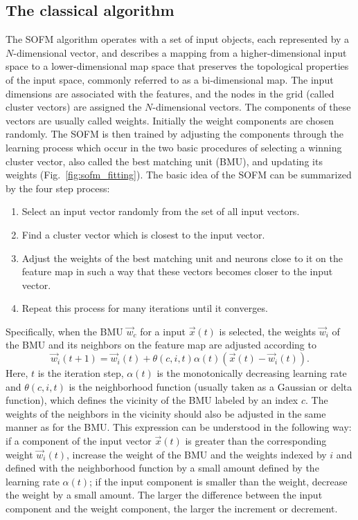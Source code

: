\documentclass[pra,showkeys,twocolumn,showpacs,aps,10pt]{revtex4-2}
\begin{document}
\subsection{The classical algorithm}

The SOFM algorithm operates with a set of input objects, each represented by a $N$-dimensional vector,
and describes a mapping from a higher-dimensional input space to a lower-dimensional map space that preserves the topological properties of the input space, commonly referred to as a bi-dimensional map.  The input dimensions are associated with the features,
and the nodes in the grid (called cluster vectors) are assigned the $N$-dimensional vectors.
The components of these vectors are usually called weights.
Initially the weight components are chosen randomly.
The SOFM is then trained by adjusting the components through the learning process which occur in the two basic procedures of
selecting a winning cluster vector, also called the best matching unit (BMU), and updating its weights (Fig.~\ref{fig:sofm_fitting}).  The basic idea of the SOFM can be summarized by the four step process:
%
\begin{enumerate}
\item Select an input vector randomly from the set of all input vectors.
\item Find a cluster vector which is closest to the input vector.
\item Adjust the weights of the best matching unit and neurons close to it on the feature map in such a way   that these vectors  becomes closer to the input vector.
\item Repeat this process for many iterations until it converges.
\end{enumerate}

Specifically, when the BMU $\vec{w}_{c}$ for a input $\vec{x}(t)$ is selected,
the weights $\vec{w}_{i}$ of the BMU and its neighbors on the feature map are adjusted according to
%
\begin{equation}
    \label{eq:learning}
  \vec{w}_{i}(t + 1)
  = \vec{w}_{i}(t)
  + \theta(c, i, t) \alpha(t)
    \left(\vec{x}(t) - \vec{w}_{i}(t)\right) .
\end{equation}
%
Here, $ t $ is the iteration step,  $\alpha(t)$ is the monotonically decreasing learning rate and $\theta(c, i, t)$ is the neighborhood function (usually taken as a Gaussian or delta function), which defines the vicinity of the BMU labeled by an index $c$. The weights of the neighbors in the vicinity should also be adjusted in the same manner as for the BMU. This expression can be understood in the following way: if a component of the input vector $\vec{x}(t)$ is greater than the corresponding weight $ \vec{w}_{i}(t) $, increase the weight of the BMU and the weights indexed by $i$ and defined with the neighborhood function by a small amount defined by the learning rate $\alpha(t)$; if the input component is smaller than the weight, decrease the weight by a small amount. The larger the difference between the input component and the weight component, the larger the increment or decrement.
\end{document}
